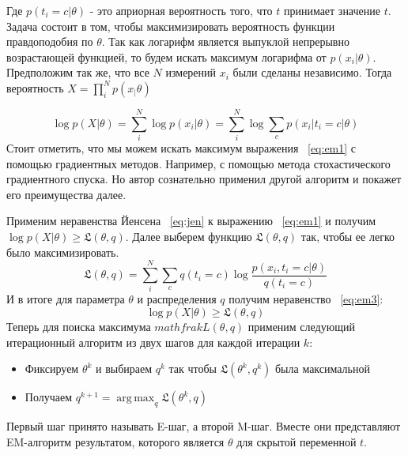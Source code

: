 Где $p \left( t_i = c \vert \theta \right)$  - это априорная вероятность того, что $t$ принимает значение $t$. 
Задача состоит в том, чтобы максимизировать вероятность функции правдоподобия по $\theta$. 
Так как логарифм является выпуклой непрерывно возрастающей функцией, то будем искать максимум логарифма от $p \left( x_i \vert	\theta \right)$. 
Предположим так же, что все $N$ измерений $x_i$ были сделаны независимо. 
Тогда вероятность $X = \prod_i^N p \left( x_ \vert \theta \right) $

\begin{equation} \label{eq:em1}
\log p \left(  X \vert	\theta \right) = \sum_i^N \log p \left( x_i \vert \theta \right) = \sum_i^N \log \sum_c p \left(  x_i \vert t_i = c \vert \theta \right)
\end{equation}
Стоит отметить, что мы можем искать максимум выражения ~\ref{eq:em1}  с помощью градиентных методов. 
Например, с помощью метода стохастического градиентного спуска. 
Но автор сознательно применил другой алгоритм и покажет его преимущества далее.

Применим неравенства Йенсена ~\ref{eq:jen} к выражению ~\ref{eq:em1} и получим $\log p \left(  X \vert	\theta \right) \geqslant \mathfrak{L}(\theta, q)$.  
Далее выберем функцию $\mathfrak{L}(\theta, q)$ так, чтобы ее легко было максимизировать.
\begin{equation} \label{eq:em2}
\mathfrak{L}(\theta, q) = \sum_i^N \sum_c q(t_i = c) \log \frac{p \left( x_i, t_i = c \vert \theta \right)}{q(t_i = c)}
\end{equation}
И в итоге для параметра $\theta$ и распределения $q$ получим неравенство ~\ref{eq:em3}:
\begin{equation} \label{eq:em3}
\log p \left(  X \vert	\theta \right) \geqslant \mathfrak{L}(\theta, q)
\end{equation}
Теперь для поиска максимума $mathfrak{L}(\theta, q)$  применим  следующий итерационный алгоритм из двух шагов для каждой итерации $k$:

\begin{itemize}
	\item Фиксируем $\theta^k$ и выбираем $q^k$ так чтобы $\mathfrak{L}(\theta^k, q^k)$ была максимальной
	\item Получаем $q^{k+1} = \operatorname*{arg\,max}_q \mathfrak{L}(\theta^k, q)$
\end{itemize}

Первый шаг принято называть E-шаг, а второй M-шаг. Вместе они представляют EM-алгоритм результатом, которого является $\theta$ для скрытой переменной $t$. 

